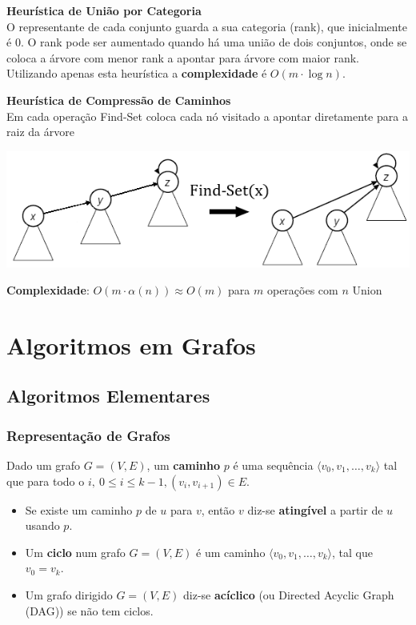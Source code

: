 \documentclass[11pt]{article}
\begin{document}
\textbf{Heurística de União por Categoria} \\[6pt]
O representante de cada conjunto guarda a sua categoria (rank), que inicialmente é 0. O rank pode ser aumentado quando há uma união de dois conjuntos, onde se coloca a árvore com menor rank a apontar para árvore com maior rank. Utilizando apenas esta heurística a \textbf{complexidade} é $O(m\cdot\log n)$.

\begin{minipage}{0.50\textwidth}
    \textbf{Heurística de Compressão de Caminhos} \\[6pt]
    Em cada operação Find-Set coloca cada nó visitado a apontar diretamente para a raiz da árvore
\end{minipage}
\begin{minipage}{0.49\textwidth}
    \includegraphics[scale=0.5,right]{three_heuristic_2.png}
\end{minipage}

\textbf{Complexidade}: $O(m\cdot\alpha(n)) \approx O(m)$ para $m$ operações com $n$ Union

\newpage

\section{Algoritmos em Grafos}

\subsection{Algoritmos Elementares} 

\subsubsection{Representação de Grafos}

Dado um grafo $G = (V,E)$, um \textbf{caminho} $p$ é uma sequência $\langle v_0,v_1, \ldots,v_k \rangle$ tal que para todo o $i,\ 0 \le i \le k-1, (v_i ,v_{i+1}) \in E$.
\begin{itemize}[topsep=0pt]
    \item Se existe um caminho $p$ de $u$ para $v$, então $v$ diz-se \textbf{atingível} a partir de $u$ usando $p$.
    \item Um \textbf{ciclo} num grafo $G = (V,E)$ é um caminho $\langle v_0,v_1, \ldots,v_k \rangle$, tal que $v_0 = v_k$.
    \item Um grafo dirigido $G = (V,E)$ diz-se \textbf{acíclico} (ou Directed Acyclic Graph (DAG)) se não tem ciclos.
\end{itemize}
\end{document}
